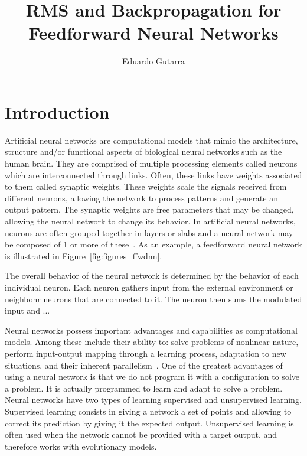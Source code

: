 \documentclass[11pt]{article}
\title{RMS and Backpropagation for Feedforward Neural Networks}
\author{Eduardo Gutarra}
\begin{document}
	
\ifpdf
{}
\else
{}
\fi
	
\maketitle
	
\section{Introduction} %
\label{sec:introduction}

Artificial neural networks are computational models that mimic the architecture, structure and/or functional aspects of biological
neural networks such as the human brain. They are comprised of multiple processing elements called neurons which are interconnected
through links. Often, these links have weights associated to them called synaptic weights. These weights scale the signals received from
different neurons, allowing the network to process patterns and generate an output pattern. The synaptic weights are free parameters
that may be changed, allowing the neural network to change its behavior. In artificial neural networks, neurons are often grouped
together in layers or slabs and a neural network may be composed of 1 or more of these~\cite{skapura}. As an example, a feedforward
neural network is illustrated in Figure~\ref{fig:figures_ffwdnn}.

The overall behavior of the neural network is determined by the behavior of each individual neuron. Each neuron gathers input from the external environment or neighbohr neurons that are connected to it. The neuron then sums the modulated input and ...

Neural networks possess important advantages and capabilities as computational models. Among these include their ability to: solve
problems of nonlinear nature, perform input-output mapping through a learning process, adaptation to new situations, and their inherent
parallelism~\cite{Haykin:1994:NNC:541500}. One of the greatest advantages of using a neural network is that we do not program it with a
configuration to solve a problem. It is actually programmed to learn and adapt to solve a problem. Neural networks have two types of
learning supervised and unsupervised learning. Supervised learning consists in giving a network a set of points and allowing to correct
its prediction by giving it the expected output. Unsupervised learning is often used when the network cannot be provided with a target
output, and therefore works with evolutionary models.
\end{document}

